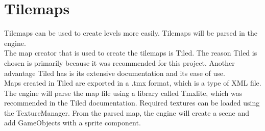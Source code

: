 \section{Tilemaps}
Tilemaps can be used to create levels more easily.
Tilemaps will be parsed in the engine.
\\
The map creator that is used to create the tilemaps is Tiled.
The reason Tiled is chosen is primarily because it was recommended for this project.
Another advantage Tiled has is its extensive documentation and its ease of use.
\\
Maps created in Tiled are exported in a .tmx format, which is a type of XML file.
The engine will parse the map file using a library called Tmxlite, which was recommended in the Tiled documentation.
Required textures can be loaded using the TextureManager.
From the parsed map, the engine will create a scene and add GameObjects with a sprite component.